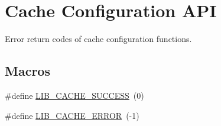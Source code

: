\hypertarget{group__libarch__cachecfg}{}\section{Cache Configuration A\+P\+I}
\label{group__libarch__cachecfg}


Error return codes of cache configuration functions.  


\subsection*{Macros}
\begin{DoxyCompactItemize}
\item 
\#define \hyperlink{group__libarch__cachecfg_ga2e6fd05c3ca05c5fda056c53f1b0e583}{L\+I\+B\+\_\+\+C\+A\+C\+H\+E\+\_\+\+S\+U\+C\+C\+E\+S\+S}~(0)
\item 
\#define \hyperlink{group__libarch__cachecfg_gab447a2c2ef93390a4ae137b80fc575a9}{L\+I\+B\+\_\+\+C\+A\+C\+H\+E\+\_\+\+E\+R\+R\+O\+R}~(-\/1)
\end{DoxyCompactItemize}
